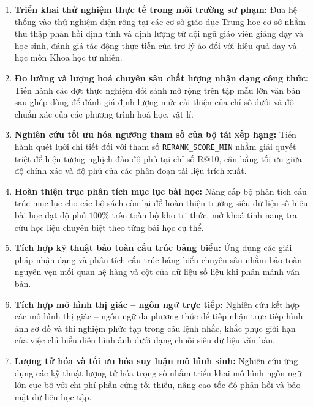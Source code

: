 \begin{enumerate}
    \item \textbf{Triển khai thử nghiệm thực tế trong môi trường sư phạm:} Đưa hệ thống vào thử nghiệm diện rộng tại các cơ sở giáo dục Trung học cơ sở nhằm thu thập phản hồi định tính và định lượng từ đội ngũ giáo viên giảng dạy và học sinh, đánh giá tác động thực tiễn của trợ lý ảo đối với hiệu quả dạy và học môn Khoa học tự nhiên.
    \item \textbf{Đo lường và lượng hoá chuyên sâu chất lượng nhận dạng công thức:} Tiến hành các đợt thực nghiệm đối sánh mở rộng trên tập mẫu lớn văn bản sau ghép dòng để đánh giá định lượng mức cải thiện của chỉ số dưới và độ chuẩn xác của các phương trình hoá học, vật lí.
    \item \textbf{Nghiên cứu tối ưu hóa ngưỡng tham số của bộ tái xếp hạng:} Tiến hành quét lưới chi tiết đối với tham số \texttt{RERANK\_SCORE\_MIN} nhằm giải quyết triệt để hiện tượng nghịch đảo độ phủ tại chỉ số R@10, cân bằng tối ưu giữa độ chính xác và độ phủ của các phân đoạn tài liệu trích xuất.
    \item \textbf{Hoàn thiện trục phân tích mục lục bài học:} Nâng cấp bộ phân tích cấu trúc mục lục cho các bộ sách còn lại để hoàn thiện trường siêu dữ liệu số hiệu bài học đạt độ phủ $100\%$ trên toàn bộ kho tri thức, mở khoá tính năng tra cứu học liệu chuyên biệt theo từng bài học cụ thể.
    \item \textbf{Tích hợp kỹ thuật bảo toàn cấu trúc bảng biểu:} Ứng dụng các giải pháp nhận dạng và phân tích cấu trúc bảng biểu chuyên sâu nhằm bảo toàn nguyên vẹn mối quan hệ hàng và cột của dữ liệu số liệu khi phân mảnh văn bản.
    \item \textbf{Tích hợp mô hình thị giác -- ngôn ngữ trực tiếp:} Nghiên cứu kết hợp các mô hình thị giác -- ngôn ngữ đa phương thức để tiếp nhận trực tiếp hình ảnh sơ đồ và thí nghiệm phức tạp trong câu lệnh nhắc, khắc phục giới hạn của việc chỉ biểu diễn hình ảnh dưới dạng chuỗi siêu dữ liệu văn bản.
    \item \textbf{Lượng tử hóa và tối ưu hóa suy luận mô hình sinh:} Nghiên cứu ứng dụng các kỹ thuật lượng tử hóa trọng số nhằm triển khai mô hình ngôn ngữ lớn cục bộ với chi phí phần cứng tối thiểu, nâng cao tốc độ phản hồi và bảo mật dữ liệu học tập.
\end{enumerate}
